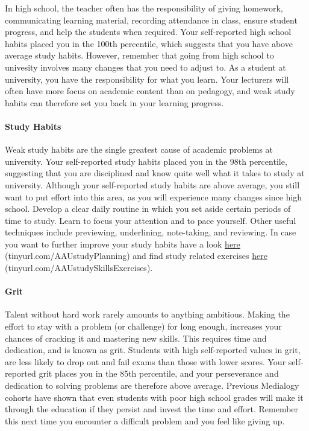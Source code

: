 \documentclass[]{article}
\let\oldparagraph\paragraph
\renewcommand{\paragraph}[1]{\oldparagraph{#1}\mbox{}}
\begin{document}
In high school, the teacher often has the responsibility of giving
homework, communicating learning material, recording attendance in
class, ensure student progress, and help the students when required.
Your self-reported high school habits placed you in the 100th
percentile, which suggests that you have above average study habits.
However, remember that going from high school to univesity involves many
changes that you need to adjust to. As a student at university, you have
the responsibility for what you learn. Your lecturers will often have
more focus on academic content than on pedagogy, and weak study habits
can therefore set you back in your learning progress.

\paragraph{Study Habits}\label{study-habits}

Weak study habits are the single greatest cause of academic problems at
university. Your self-reported study habits placed you in the 98th
percentile, suggesting that you are disciplined and know quite well what
it takes to study at university. Although your self-reported study
habits are above average, you still want to put effort into this area,
as you will experience many changes since high school. Develop a clear
daily routine in which you set aside certain periods of time to study.
Learn to focus your attention and to pace yourself. Other useful
techniques include previewing, underlining, note-taking, and reviewing.
In case you want to further improve your study habits have a look
\href{tinyurl.com/AAUstudyPlanning}{here} (tinyurl.com/AAUstudyPlanning)
and find study related exercises
\href{tinyurl.com/AAUstudySkillsExercises}{here}
(tinyurl.com/AAUstudySkillsExercises).

\paragraph{Grit}\label{grit}

Talent without hard work rarely amounts to anything ambitious. Making
the effort to stay with a problem (or challenge) for long enough,
increases your chances of cracking it and mastering new skills. This
requires time and dedication, and is known as grit. Students with high
self-reported values in grit, are less likely to drop out and fail exams
than those with lower scores. Your self-reported grit places you in the
85th percentile, and your perseverance and dedication to solving
problems are therefore above average. Previous Medialogy cohorts have
shown that even students with poor high school grades will make it
through the education if they persist and invest the time and effort.
Remember this next time you encounter a difficult problem and you feel
like giving up.
\end{document}
